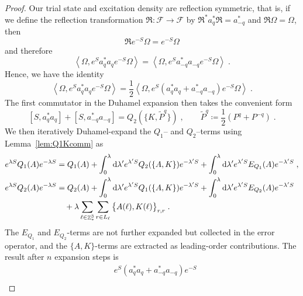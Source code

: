 \documentclass[12pt,a4paper]{article}
\numberwithin{equation}{section}
\newcommand{\cF}{\mathcal{F}}
\newcommand{\fR}{\mathfrak{R}}
\newcommand{\1}{\mathbb{I}}
\newcommand{\di}{\textnormal{d}}
\DeclareMathOperator{\Z}{\mathbb{Z}}
\newcommand{\half}{\frac{1}{2}}
\newcommand{\eva}[1]{\left\langle #1 \right\rangle}
\theoremstyle{plain}
\theoremstyle{definition}
\theoremstyle{remark}
\theoremstyle{plain}
\theoremstyle{definition}
\theoremstyle{remark}
\begin{document}
\begin{proof}
Our trial state and excitation density are reflection symmetric, that is, if we define the reflection transformation $ \fR: \cF \to \cF $ by $ \fR^* a_q^* \fR = a^*_{-q} $ and $ \fR \Omega = \Omega $, then
\begin{equation} \label{eq:reflectionsymmetry}
	\fR e^{-S} \Omega = e^{-S} \Omega
\end{equation}
and therefore
\begin{equation}
	\eva{\Omega, e^{S} a^*_q a_q e^{-S}\Omega} = \eva{\Omega, e^{S} a^*_{-q} a_{-q} e^{-S} \Omega} \;.
\end{equation}
Hence, we have the identity
\begin{equation}
	\eva{\Omega, e^{S} a_q^* a_q e^{-S} \Omega} = \half \eva{\Omega, e^{S} (a_q^* a_q + a_{-q}^* a_{-q}) e^{-S} \Omega} \;.
\end{equation}
The first commutator in the Duhamel expansion then takes the convenient form
\begin{equation} \label{eq:firstcommutator}
	[S, a_q^* a_q] + [S, a_{-q}^* a_{-q}]
	= Q_2(\{K,\tilde{P}^q\}) \;, \qquad
	\tilde{P}^q \coloneq \half(P^q + P^{-q}) \;.
\end{equation}
We then iteratively Duhamel-expand the $ Q_1$-- and $ Q_2 $--terms using Lemma~\ref{lem:Q1Kcomm} as
\begin{equation}
\begin{aligned}
	e^{\lambda S} Q_1(A) e^{-\lambda S}
	&= Q_1(A) + \int_0^{\lambda} \di \lambda' e^{\lambda' S} Q_2(\{A,K\}) e^{-\lambda' S}
		+ \int_0^{\lambda} \di \lambda' e^{\lambda' S} E_{Q_1}(A) e^{-\lambda' S} \;, \\
	e^{\lambda S} Q_2(A) e^{-\lambda S}
	&= Q_2(A) + \int_0^{\lambda} \di \lambda' e^{\lambda' S} Q_1(\{A,K\}) e^{-\lambda' S}
		+ \int_0^{\lambda} \di \lambda' e^{\lambda' S} E_{Q_2}(A) e^{-\lambda' S} \\
	&\quad + \lambda \sum_{\ell \in \Z^3_*} \sum_{r \in L_{\ell}} \big\{ A(\ell), K(\ell) \big\}_{r,r} \;.
\end{aligned}
\end{equation}
The $ E_{Q_1} $ and $ E_{Q_2} $-terms are not further expanded but collected in the error operator, and the $ \{A,K\} $-terms are extracted as leading-order contributions. The result after $ n $ expansion steps is
\begin{equation}
\begin{aligned}
	&e^{S} (a_q^* a_q + a_{-q}^* a_{-q}) e^{-S} \\

\end{aligned}
\end{equation}
\end{proof}
\end{document}
